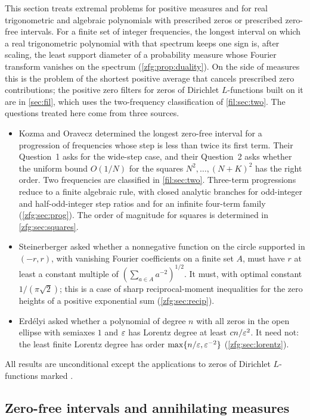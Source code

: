 This section treats extremal problems for positive measures and for real trigonometric and algebraic
polynomials with prescribed zeros or prescribed zero-free intervals. For a finite set of integer
frequencies, the longest interval on which a real trigonometric polynomial with that spectrum keeps one
sign is, after scaling, the least support diameter of a probability measure whose Fourier transform
vanishes on the spectrum (\cref{zfg:prop:duality}). On the side of measures this is the problem of the
shortest positive average that cancels prescribed zero contributions; the positive zero filters for zeros
of Dirichlet $L$-functions built on it are in \cref{sec:fil}, which uses the two-frequency classification
of \cref{fil:sec:two}. The questions treated here come from three sources.
\begin{itemize}
\item Kozma and Oravecz \cite{KozmaOravecz2003Gaps} determined the longest zero-free interval for a
progression of frequencies whose step is less than twice its first term. Their Question~1 asks for the
wide-step case, and their Question~2 asks whether the uniform bound $O(1/N)$ for the squares
$N^2,\dots,(N+K)^2$ has the right order. Two frequencies are classified in \cref{fil:sec:two}. Three-term
progressions reduce to a finite algebraic rule, with closed analytic branches for odd-integer and
half-odd-integer step ratios and for an infinite four-term family (\cref{zfg:sec:prog}). The order of
magnitude for squares is determined in \cref{zfg:sec:squares}.
\item Steinerberger \cite{Steinerberger2026Open} asked whether a nonnegative function on the circle
supported in $(-r,r)$, with vanishing Fourier coefficients on a finite set $A$, must have $r$ at least a
constant multiple of $(\sum_{a\in A}a^{-2})^{1/2}$. It must, with optimal constant $1/(\pi\sqrt2)$; this is a case
of sharp reciprocal-moment inequalities for the zero heights of a positive exponential sum
(\cref{zfg:sec:recip}).
\item Erd\'elyi \cite{Erdelyi1991Estimates} asked whether a polynomial of degree $n$ with all zeros in the
open ellipse with semiaxes $1$ and $\varepsilon$ has Lorentz degree at least $cn/\varepsilon^2$. It need not: the least
finite Lorentz degree has order $\max\{n/\varepsilon,\varepsilon^{-2}\}$ (\cref{zfg:sec:lorentz}).
\end{itemize}
All results are unconditional except the applications to zeros of Dirichlet $L$-functions marked \stG.

\subsection{Zero-free intervals and annihilating measures}\label{zfg:sec:dual}

